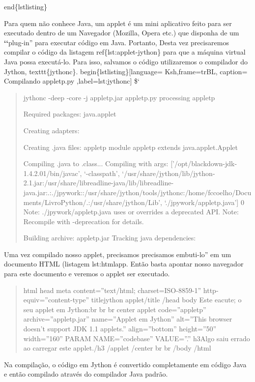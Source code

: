 \documentclass[a4paper,10pt,portuguese]{sphinxmanual}
\begin{document}
end\{lstlisting\}

Para quem não conhece Java, um applet é um mini aplicativo feito para ser executado dentro de um Navegador (Mozilla, Opera etc.) que disponha de um {\color{red}\bfseries{}{}`{}`}plug-in'' para executar código em Java. Portanto, Desta vez precisaremos compilar o código da listagem ref\{lst:applet-jython\} para que a máquina virtual Java possa executá-lo. Para isso, salvamos o código  utilizaremos o compilador do Jython, texttt\{jythonc\}.
begin\{lstlisting\}{[}language= Ksh,frame=trBL, caption= Compilando appletp.py ,label=lst:jythonc{]}
\${}`
\begin{quote}

jythonc -deep -core -j appletp.jar appletp.py processing appletp

Required packages: java.applet

Creating adapters:

Creating .java files: appletp module appletp extends
java.applet.Applet

Compiling .java to .class... Compiling with args:
{[}'/opt/blackdown-jdk-1.4.2.01/bin/javac', `-classpath',
`/usr/share/jython/lib/jython-2.1.jar:/usr/share/libreadline-java/lib/libreadline-java.jar:.:./jpywork::/usr/share/jython/tools/jythonc:/home/fccoelho/Documents/LivroPython/.:/usr/share/jython/Lib',
`./jpywork/appletp.java'{]} 0 Note: ./jpywork/appletp.java uses or
overrides a deprecated API. Note: Recompile with -deprecation for
details.

Building archive: appletp.jar Tracking java dependencies:
\end{quote}

Uma vez compilado nosso applet, precisamos precisamos embuti-lo'' em
um documento HTML (listagem lst:htmlapp. Então basta apontar nosso
navegador para este documento e veremos o applet ser executado.
\begin{quote}

html head meta content=''text/html; charset=ISO-8859-1''
http-equiv=''content-type'' titlejython applet/title /head body Este
eacute; o seu applet em Jython:br br br center applet
code=''appletp'' archive=''appletp.jar'' name=''Applet em Jython''
alt=''This browser doesn't support JDK 1.1 applets.'' align=''bottom''
height=''50'' width=''160'' PARAM NAME=''codebase'' VALUE=''.'' h3Algo saiu
errado ao carregar este applet./h3 /applet /center br br /body
/html
\end{quote}

Na compilação, o código em Jython é convertido completamente em
código Java e então compilado através do compilador Java padrão.
\end{document}
